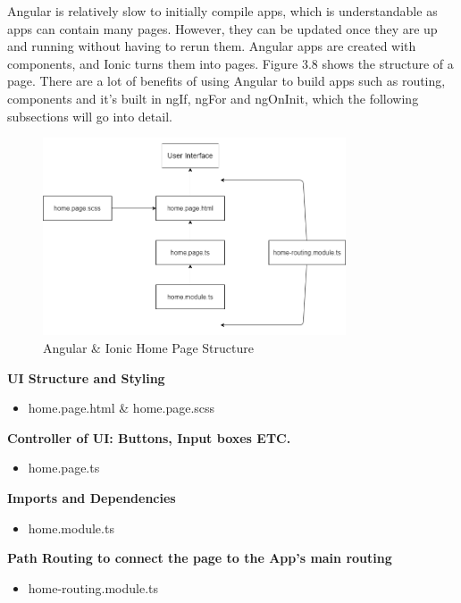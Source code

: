 Angular is relatively slow to initially compile apps, which is understandable as apps can contain many pages. However, they can be updated once they are up and running without having to rerun them. Angular apps are created with components, and Ionic turns them into pages. Figure 3.8 shows the structure of a page. There are a lot of benefits of using Angular to build apps such as routing, components and it's built in ngIf, ngFor and ngOnInit, which the following subsections will go into detail.

\begin{figure}[H]
    \caption{Angular \& Ionic Home Page Structure}
    \label{image:ngHomePage}
    \centering
    \includegraphics[width=0.8\textwidth]{images/misc/ng-homepage.png}
\end{figure}

\textbf{UI Structure and Styling}
\begin{itemize}
    \item home.page.html \& home.page.scss
\end{itemize} 

\textbf{Controller of UI: Buttons, Input boxes ETC.}
\begin{itemize}
    \item home.page.ts 
\end{itemize} 

\textbf{Imports and Dependencies}
\begin{itemize}
    \item home.module.ts
\end{itemize} 

\textbf{Path Routing to connect the page to the App's main routing}
\begin{itemize}
    \item home-routing.module.ts
\end{itemize} 

